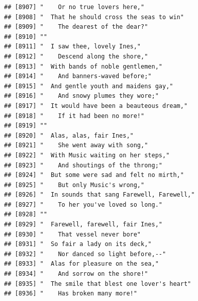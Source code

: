 \documentclass{article}\usepackage[]{graphicx}\usepackage[]{color}
\makeatletter
\newenvironment{kframe}{%
 \def\at@end@of@kframe{}%
 \ifinner\ifhmode%
  \def\at@end@of@kframe{\end{minipage}}%
  \begin{minipage}{\columnwidth}%
 \fi\fi%
 \def\FrameCommand##1{\hskip\@totalleftmargin \hskip-\fboxsep
 \colorbox{shadecolor}{##1}\hskip-\fboxsep
     \hskip-\linewidth \hskip-\@totalleftmargin \hskip\columnwidth}%
 \MakeFramed {\advance\hsize-\width
   \@totalleftmargin\z@ \linewidth\hsize
   \@setminipage}}%
 {\par\unskip\endMakeFramed%
 \at@end@of@kframe}
\newenvironment{knitrout}{}{} %
\makeatother
\begin{document}
\begin{knitrout}
\begin{kframe}
\begin{verbatim}
## [8907] "    Or no true lovers here,"                                                 
## [8908] "  That he should cross the seas to win"                                      
## [8909] "    The dearest of the dear?"                                                
## [8910] ""                                                                            
## [8911] "  I saw thee, lovely Ines,"                                                  
## [8912] "    Descend along the shore,"                                                
## [8913] "  With bands of noble gentlemen,"                                            
## [8914] "    And banners-waved before;"                                               
## [8915] "  And gentle youth and maidens gay,"                                         
## [8916] "    And snowy plumes they wore;"                                             
## [8917] "  It would have been a beauteous dream,"                                     
## [8918] "    If it had been no more!"                                                 
## [8919] ""                                                                            
## [8920] "  Alas, alas, fair Ines,"                                                    
## [8921] "    She went away with song,"                                                
## [8922] "  With Music waiting on her steps,"                                          
## [8923] "    And shoutings of the throng;"                                            
## [8924] "  But some were sad and felt no mirth,"                                      
## [8925] "    But only Music's wrong,"                                                 
## [8926] "  In sounds that sang Farewell, Farewell,"                                   
## [8927] "    To her you've loved so long."                                            
## [8928] ""                                                                            
## [8929] "  Farewell, farewell, fair Ines,"                                            
## [8930] "    That vessel never bore"                                                  
## [8931] "  So fair a lady on its deck,"                                               
## [8932] "    Nor danced so light before,--"                                           
## [8933] "  Alas for pleasure on the sea,"                                             
## [8934] "    And sorrow on the shore!"                                                
## [8935] "  The smile that blest one lover's heart"                                    
## [8936] "    Has broken many more!"                                                   

\end{verbatim}
\end{kframe}
\end{knitrout}
\end{document}
